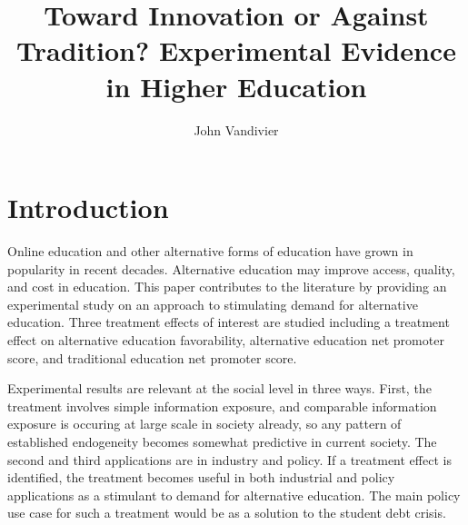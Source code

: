 \documentclass[review]{elsarticle}
\begin{document}
\begin{frontmatter}

\title{
    Toward Innovation or Against Tradition? Experimental Evidence in Higher Education %
}

\author[mymainaddress]{John Vandivier}
\address[mymainaddress]{4400 University Dr, Fairfax, VA 22030}


\begin{abstract}
\end{abstract}

\begin{keyword}
\MSC[2010] %
\end{keyword}

\end{frontmatter}

\pagebreak
\linenumbers

    \section{Introduction}
    
    Online education and other alternative forms of education have grown in popularity in recent decades.
    Alternative education may improve access, quality, and cost in education.
    This paper contributes to the literature by providing an experimental study on an approach to stimulating demand
    for alternative education.
    Three treatment effects of interest are studied including a treatment effect on alternative education favorability,
    alternative education net promoter score,
    and traditional education net promoter score.
    
    Experimental results are relevant at the social level in three ways. First, the treatment involves simple information exposure,
    and comparable information exposure is occuring at large scale in society already, so any pattern of established endogeneity
    becomes somewhat predictive in current society. The second and third applications are in industry and policy. If a treatment effect is
    identified, the treatment becomes useful in both industrial and policy applications as a stimulant to demand for alternative education.
    The main policy use case for such a treatment would be as a solution to the student debt crisis.
\end{document}
